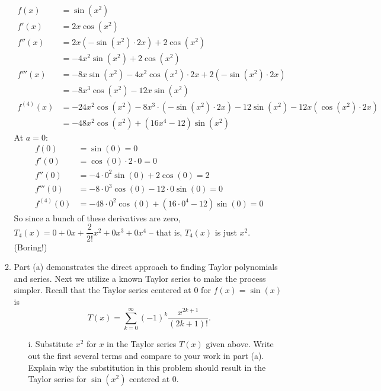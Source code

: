 \documentclass[10pt]{article}
\newenvironment{red}{\color{red}}{\ignorespacesafterend}
\begin{document}
\begin{enumerate}[leftmargin=0pt]
\begin{enumerate}
    \begin{red}
    \begin{align*}
        f(x) &= \sin(x^2)\\
        f'(x) &= 2x \cos(x^2) \\
        f''(x) &= 2x(-\sin(x^2)\cdot 2x) + 2 \cos(x^2)  \\
        &= -4x^2 \sin(x^2) + 2\cos(x^2) \\
        f'''(x) &= -8x\sin(x^2) - 4x^2\cos(x^2)\cdot 2x + 2(-\sin(x^2)\cdot 2x) \\
        &= -8x^3 \cos(x^2) - 12x\sin(x^2) \\
        f^{(4)}(x) &= -24x^2\cos(x^2) -8x^3\cdot(-\sin(x^2)\cdot 2x)
        - 12 \sin(x^2) - 12x(\cos(x^2)\cdot 2x) \\
        &= -48x^2\cos(x^2)+(16x^4 - 12)\sin(x^2)
    \end{align*}
    At $a=0$:
    \begin{align*}
        f(0) &= \sin(0) = 0 \\
        f'(0) &= \cos(0) \cdot 2\cdot 0 = 0 \\
        f''(0) &= -4\cdot 0^2 \sin(0) + 2 \cos(0) = 2  \\
        f'''(0) &= -8\cdot 0^3\cos(0) - 12\cdot 0 \sin(0) = 0 \\
        f^{(4)}(0) &= -48\cdot 0^2 \cos(0) + (16\cdot 0^4 - 12)\sin(0) = 0
    \end{align*}
    So since a bunch of these derivatives are zero, $T_4(x) = 0 + 0x + \dfrac{2}{2!}x^2 + 0x^3 + 0x^4 $ -- that is, $T_4(x)$ is just $x^2$. (Boring!)
    \end{red}
    \item Part (a) demonstrates the direct approach to finding Taylor polynomials and series. Next we utilize a known Taylor series to make the process simpler. Recall that the Taylor series centered at 0 for $f(x) = \sin(x)$ is
    \begin{equation}
    T(x) = \sum_{k=0}^{\infty} (-1)^{k} \frac{x^{2k+1}}{(2k+1)!}\text{.}
    \end{equation}
    \begin{enumerate}
        \item[i.] Substitute $x^2$ for $x$ in the Taylor series $T(x)$ given above. Write out the first several terms and compare to your work in part (a). Explain why the substitution in this problem should result in the Taylor series for $\sin(x^2)$ centered at 0.


\end{enumerate}
\end{enumerate}
\end{enumerate}
\end{document}
